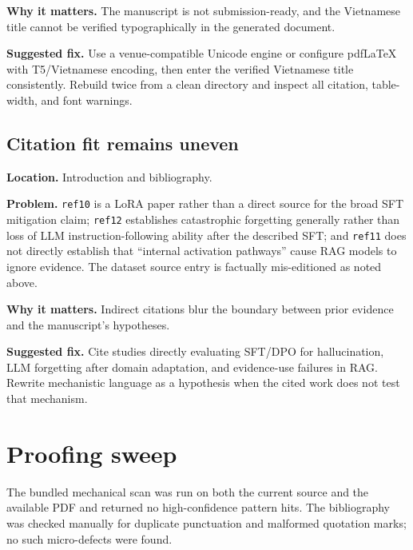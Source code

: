 \documentclass[11pt]{article}
\newcommand{\findinglabel}[1]{\textbf{#1}}
\begin{document}
\findinglabel{Why it matters.} The manuscript is not submission-ready, and the Vietnamese title cannot be verified typographically in the generated document.

\findinglabel{Suggested fix.} Use a venue-compatible Unicode engine or configure pdfLaTeX with T5/Vietnamese encoding, then enter the verified Vietnamese title consistently.  Rebuild twice from a clean directory and inspect all citation, table-width, and font warnings.

\subsection*{Citation fit remains uneven}

\findinglabel{Location.} Introduction and bibliography.

\findinglabel{Problem.} \texttt{ref10} is a LoRA paper rather than a direct source for the broad SFT mitigation claim; \texttt{ref12} establishes catastrophic forgetting generally rather than loss of LLM instruction-following ability after the described SFT; and \texttt{ref11} does not directly establish that ``internal activation pathways'' cause RAG models to ignore evidence.  The dataset source entry is factually mis-editioned as noted above.

\findinglabel{Why it matters.} Indirect citations blur the boundary between prior evidence and the manuscript's hypotheses.

\findinglabel{Suggested fix.} Cite studies directly evaluating SFT/DPO for hallucination, LLM forgetting after domain adaptation, and evidence-use failures in RAG.  Rewrite mechanistic language as a hypothesis when the cited work does not test that mechanism.

\section*{Proofing sweep}

The bundled mechanical scan was run on both the current source and the available PDF and returned no high-confidence pattern hits.  The bibliography was checked manually for duplicate punctuation and malformed quotation marks; no such micro-defects were found.
\end{document}
